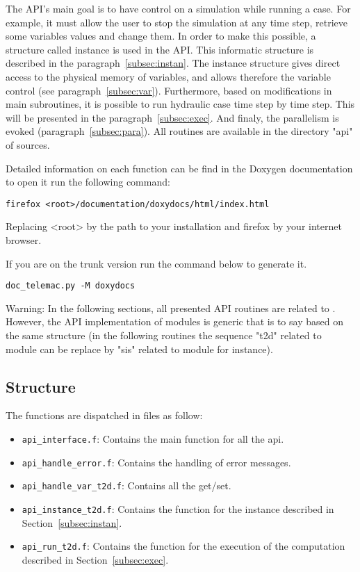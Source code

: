 The API’s main goal is to have control on a simulation while running a case.
For example, it must allow the user to stop the simulation at any time step,
retrieve some variables values and change them. In order to make this possible,
a \fortran{} structure called instance is used in the API\@. This informatic
structure is described in the paragraph~\ref{subsec:instan}. The instance
structure gives direct access to the physical memory of variables, and allows
therefore the variable control (see paragraph~\ref{subsec:var}). Furthermore,
based on modifications in \telemacsystem{} main subroutines, it is possible to
run hydraulic case time step by time step. This will be
presented in the paragraph~\ref{subsec:exec}. And finaly, the parallelism is
evoked (paragraph~\ref{subsec:para}).
All \fortran{} routines are available in the directory "api" of \telemacsystem{}
sources.

Detailed information on each function can be find in the Doxygen documentation to open it run the following command:

\begin{lstlisting}
firefox <root>/documentation/doxydocs/html/index.html
\end{lstlisting}

Replacing <root> by the path to your installation and firefox by your internet browser.

If you are on the trunk version run the command below to generate it.

\begin{lstlisting}
doc_telemac.py -M doxydocs
\end{lstlisting}

\begin{WarningBlock}{Warning:}
\centering
 In the following sections, all presented API routines are related to
 . However, the API implementation of \telemacsystem{} modules is
 generic that is to say based on the same structure (in the following routines
 the sequence "t2d" related to  module can be replace by "sis"
  related to \sisyphe{} module for instance).
\end{WarningBlock}

\subsection{Structure}

The functions are dispatched in \fortran{} files as follow:
\begin{itemize}
  \item \verb!api_interface.f!: Contains the main function for all the api.
  \item \verb!api_handle_error.f!: Contains the handling of error messages.
  \item \verb!api_handle_var_t2d.f!: Contains all the get/set.
  \item \verb!api_instance_t2d.f!: Contains the function for the instance
    described in Section~\ref{subsec:instan}.
  \item \verb!api_run_t2d.f!: Contains the function for the execution of the
    computation described in Section~\ref{subsec:exec}.
\end{itemize}

